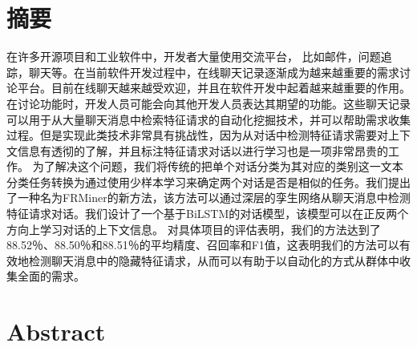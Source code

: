 \maketitle%
\MAKETITLE%
\makedeclaration%
\intobmk\chapter*{摘\quad 要}%
\setcounter{page}{1}%

在许多开源项目和工业软件中，开发者大量使用交流平台， 比如邮件，问题追踪，聊天等。在当前软件开发过程中，在线聊天记录逐渐成为越来越重要的需求讨论平台。目前在线聊天越来越受欢迎，并且在软件开发中起着越来越重要的作用。在讨论功能时，开发人员可能会向其他开发人员表达其期望的功能。这些聊天记录可以用于从大量聊天消息中检索特征请求的自动化挖掘技术，并可以帮助需求收集过程。但是实现此类技术非常具有挑战性，因为从对话中检测特征请求需要对上下文信息有透彻的了解，并且标注特征请求对话以进行学习也是一项非常昂贵的工作。
为了解决这个问题，我们将传统的把单个对话分类为其对应的类别这一文本分类任务转换为通过使用少样本学习来确定两个对话是否是相似的任务。我们提出了一种名为FRMiner的新方法，该方法可以通过深层的孪生网络从聊天消息中检测特征请求对话。我们设计了一个基于BiLSTM的对话模型，该模型可以在正反两个方向上学习对话的上下文信息。
对具体项目的评估表明，我们的方法达到了88.52％、88.50％和88.51％的平均精度、召回率和F1值，这表明我们的方法可以有效地检测聊天消息中的隐藏特征请求，从而可以有助于以自动化的方式从群体中收集全面的需求。


\intobmk\chapter*{Abstract}%

